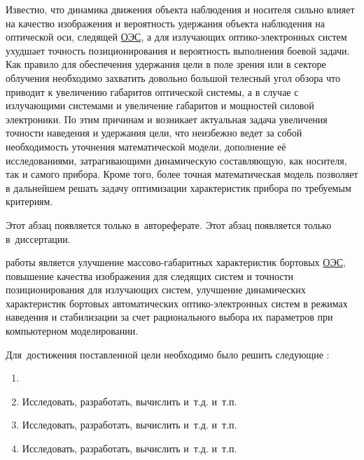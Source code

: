 Известно, что динамика движения объекта наблюдения и носителя сильно влияет на качество изображения и вероятность удержания объекта наблюдения на оптической оси, следящей  \hyperref[acroEOS]{ОЭС}, а для излучающих оптико-электронных систем ухудшает точность позиционирования и вероятность выполнения боевой задачи.  Как правило для обеспечения удержания цели в поле зрения или в секторе облучения необходимо захватить довольно большой телесный угол обзора что приводит к увеличению габаритов оптической системы, а в случае с излучающими системами и увеличение габаритов и мощностей силовой электроники. По этим причинам и возникает актуальная задача увеличения точности наведения и удержания цели, что неизбежно ведет за собой необходимость уточнения математической модели, дополнение её исследованиями, затрагивающими динамическую составляющую, как носителя, так и самого прибора. Кроме того, более точная математическая модель позволяет в дальнейшем решать задачу оптимизации характеристик прибора по требуемым критериям.

\ifsynopsis
Этот абзац появляется только в~автореферате.
\else
Этот абзац появляется только в~диссертации.
\fi


{\aim} работы является улучшение массово-габаритных характеристик бортовых  \hyperref[acroEOS]{ОЭС}, повышение качества изображения для следящих систем и точности позиционирования для излучающих систем, улучшение динамических характеристик бортовых автоматических оптико-электронных систем в режимах наведения и стабилизации за счет рационального выбора их параметров при компьютерном моделировании.

Для~достижения поставленной цели необходимо было решить следующие {\tasks}:
\begin{enumerate}
  \item {}
  \item Исследовать, разработать, вычислить и~т.\:д. и~т.\:п.
  \item Исследовать, разработать, вычислить и~т.\:д. и~т.\:п.
  \item Исследовать, разработать, вычислить и~т.\:д. и~т.\:п.
\end{enumerate}


